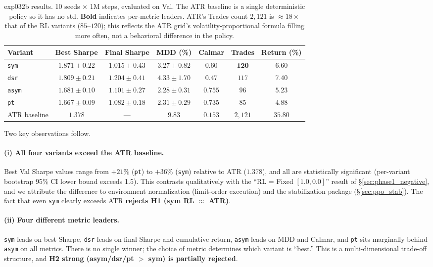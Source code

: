 \documentclass[11pt, a4paper]{article}
\begin{document}
\begin{table}[!htbp]
\centering
\small
\caption{exp032b results. 10 seeds $\times$ 1M steps, evaluated on Val. The
ATR baseline is a single deterministic policy so it has no std.
\textbf{Bold} indicates per-metric leaders. ATR's Trades count $2{,}121$ is
$\approx 18\times$ that of the RL variants ($85$--$120$); this reflects the
ATR grid's volatility-proportional formula filling more often, not a
behavioral difference in the policy.}
\begin{tabular}{lcccccc}
\toprule
Variant & Best Sharpe & Final Sharpe & MDD (\%) & Calmar & Trades & Return (\%) \\
\midrule
\texttt{sym}  & $\mathbf{1.871 \pm 0.22}$ & $1.015 \pm 0.43$ & $3.27 \pm 0.82$ &
$0.60$ & $\mathbf{120}$ & $6.60$ \\
\texttt{dsr}  & $1.809 \pm 0.21$ & $\mathbf{1.204 \pm 0.41}$ & $4.33 \pm 1.70$ &
$0.47$ & $117$ & $\mathbf{7.40}$ \\
\texttt{asym} & $1.681 \pm 0.10$ & $1.101 \pm 0.27$ & $\mathbf{2.28 \pm 0.31}$ &
$\mathbf{0.755}$ & $96$ & $5.23$ \\
\texttt{pt}   & $1.667 \pm 0.09$ & $1.082 \pm 0.18$ & $2.31 \pm 0.29$ &
$0.735$ & $85$ & $4.88$ \\
\midrule
ATR baseline & $1.378$ & --- & $9.83$ & $0.153$ & $2{,}121$ & $35.80$ \\
\bottomrule
\end{tabular}
\label{tab:pareto_metrics}
\end{table}

Two key observations follow.

\paragraph{(i) All four variants exceed the ATR baseline.}
Best Val Sharpe values range from $+21\%$ (\texttt{pt}) to $+36\%$ (\texttt{sym})
relative to ATR ($1.378$), and all are statistically significant
(per-variant bootstrap 95\% CI lower bound exceeds 1.5). This contrasts
qualitatively with the ``RL = Fixed $[1.0, 0.0]$'' result of
\S\ref{sec:phase1_negative}, and we attribute the difference to environment
normalization (limit-order execution) and the stabilization package
(\S\ref{sec:ppo_stab}). The fact that even \texttt{sym} clearly exceeds ATR
\textbf{rejects H1 (sym RL $\approx$ ATR)}.

\paragraph{(ii) Four different metric leaders.}
\texttt{sym} leads on best Sharpe, \texttt{dsr} leads on final Sharpe and
cumulative return, \texttt{asym} leads on MDD and Calmar, and \texttt{pt}
sits marginally behind \texttt{asym} on all metrics. There is no single winner;
the choice of metric determines which variant is ``best.'' This is a
multi-dimensional trade-off structure, and \textbf{H2 strong (asym/dsr/pt $>$
sym) is partially rejected}.
\end{document}
